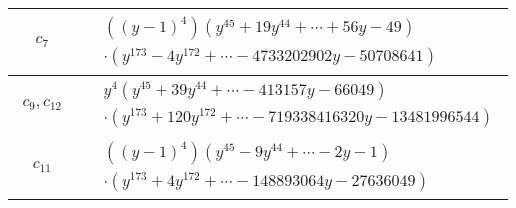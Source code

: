 \documentclass[1p]{elsarticle_modified}
\theoremstyle{definition}
\begin{document}
\begin{tabular}{m{50pt}|m{274pt}}
\hline $$\begin{aligned}c_{7}\end{aligned}$$&$\begin{aligned}
&((y-1)^4)(y^{45}+19 y^{44}+\cdots+56 y-49)\\
&\cdot(y^{173}-4 y^{172}+\cdots-4733202902 y-50708641)
\end{aligned}$\\
\hline $$\begin{aligned}c_{9},c_{12}\end{aligned}$$&$\begin{aligned}
&y^4(y^{45}+39 y^{44}+\cdots-413157 y-66049)\\
&\cdot(y^{173}+120 y^{172}+\cdots-719338416320 y-13481996544)
\end{aligned}$\\
\hline $$\begin{aligned}c_{11}\end{aligned}$$&$\begin{aligned}
&((y-1)^4)(y^{45}-9 y^{44}+\cdots-2 y-1)\\
&\cdot(y^{173}+4 y^{172}+\cdots-148893064 y-27636049)
\end{aligned}$\\
\hline
\end{tabular}
\vskip 2pc
\end{document}
